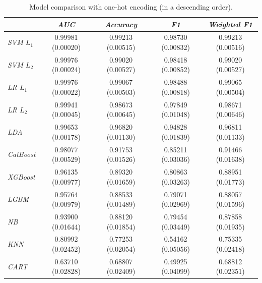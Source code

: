 \documentclass[11pt]{article}
\begin{document}
\begin{table}[H]
    \centering
    \begin{tabular}{l|c c c c}
        \hline\hline
         & \textsl{AUC} & \textsl{Accuracy} & \textsl{F1} & \textsl{Weighted F1}\\
        \hline
        \textsl{SVM $L_1$} & 0.99981 (0.00020) &  0.99213 (0.00515) &  0.98730 (0.00832) &  0.99213 (0.00516) \\
        \hline
        \textsl{SVM $L_2$} & 0.99976 (0.00024) &  0.99020 (0.00527) &  0.98418 (0.00852) &  0.99020 (0.00527)   \\
        \hline 
        \textsl{LR $L_1$} & 0.99976 (0.00022) &  0.99067 (0.00503) &  0.98488 (0.00818) &  0.99065 (0.00504) \\
        \hline
        \textsl{LR $L_2$} & 0.99941 (0.00045) &  0.98673 (0.00645) &  0.97849 (0.01048) &  0.98671 (0.00646) \\
        \hline
        \textsl{LDA} & 0.99653 (0.00178) & 0.96820 (0.01130) & 0.94828 (0.01839) & 0.96811 (0.01133) \\
        \hline
        \textsl{CatBoost} & 0.98077 (0.00529) & 0.91753 (0.01526) & 0.85211 (0.03036) & 0.91466 (0.01638) \\
        \hline
        \textsl{XGBoost} & 0.96135 (0.00977) & 0.89320 (0.01659) & 0.80863 (0.03263) & 0.88951 (0.01773) \\
        \hline
        \textsl{LGBM} & 0.95764 (0.00979) & 0.88533 (0.01489) & 0.79071 (0.02969) & 0.88057 (0.01596)  \\
        \hline
        \textsl{NB} & 0.93900 (0.01644) & 0.88120 (0.01854) & 0.79454 (0.03449) & 0.87858 (0.01935) \\
        \hline
        \textsl{KNN} & 0.80992 (0.02452) & 0.77253 (0.02054) & 0.54162 (0.05056) & 0.75335 (0.02418) \\
        \hline
        \textsl{CART} & 0.63710 (0.02828) & 0.68807 (0.02409) & 0.49925 (0.04099) & 0.68812 (0.02351) \\
        \hline\hline
    \end{tabular}
    \caption{Model comparison with one-hot encoding (in a descending order).}
    \label{tab:model-comparison-onehot}
\end{table}
\end{document}
